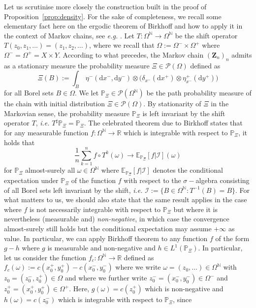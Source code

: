\documentclass[leqno, 11pt, a4paper]{amsart}
\theoremstyle{definition}
\newcommand{\cZ}{\mathbf{Z}}
\newcommand{\R}{\mathbb{R}}
\newcommand{\E}{\mathbb{E}}
\newcommand{\N}{\mathbb{N}}
\newcommand{\Pro}{\mathbb{P}}
\newcommand{\cP}{\mathcal{P}}
\newcommand{\dd}{\mathrm{d}}
\begin{document}
	Let us scrutinise more closely the construction built in the proof of Proposition~\ref{prop:density}. For the sake of  completeness, we recall some elementary fact here on the ergodic theorem of Birkhoff and how to apply it in the context of Markov chains, see \textit{e.g.} \cite{kallenbergFoundationsModernProbability2021a}. Let $T : \Omega^\N \to \Omega^\N$ be the shift operator $T(z_0, z_1, \dots) = (z_1, z_2, \dots)$, where we recall that $\Omega := \Omega^- \times \Omega^+$ where $\Omega^- = \Omega^+ = X \times Y$. According to what precedes, the Markov chain $(\cZ_n)_{n}$ admits as a stationary measure the probability measure $\Xi \in \cP(\Omega)$ defined as
	$$
	\Xi(B) := \int_{B}  \, \eta^-(\dd x^-,\dd y^-) \otimes \big(\delta_{x^-}(\dd x^+) \otimes \eta^+_{x^-}(\dd y^+)\big)
	$$
	for all Borel sets $B \in \Omega$. We let $\Pro_\Xi \in \cP(\Omega^\N)$ be the path probability measure of the chain with initial distribution $\Xi \in \cP(\Omega)$. By stationarity of $\Xi$ in the Markovian sense, the probability measure $\Pro_\Xi$ is left invariant by the shift operator  $T$, \textit{i.e.} $T^\sharp \Pro_\Xi = \Pro_\Xi$. The celebrated theorem due to Birkhoff states that for any measurable function $f : \Omega^\N \to \R$ which is integrable with respect to $\Pro_\Xi$, it holds that 
	$$
	\frac1n \sum_{k = 1}^n f \circ T^k(\omega) \to \E_{\Pro_\Xi}[f | \mathcal{I}](\omega)
	$$
	for $\Pro_\Xi$ almost-surely all $\omega \in \Omega^\N$ where $\E_{\Pro_\Xi}[f | \mathcal{I}]$ denotes the conditional expectation under $\Pro_\Xi$ of the function $f$ with respect to the $\sigma-$algebra consisting of all Borel sets left invariant by the shift, \textit{i.e.} $\mathcal{I} := \{ B \in \Omega^\N : T^{-1}(B) = B\}$. For what matters to us, we should also state that the same result applies in the case where $f$ is not necessarily integrable with respect to $\Pro_\Xi$ but where it is nevertheless (measurable and) \textit{non-negative}, in which case the convergence almost-surely still holds but the conditional expectation may assume $+\infty$ as value.  In particular, we can apply Birkhoff theorem to any function $f$ of the form $g - h$ where $g$ is measurable and non-negative and $h \in L^1(\Pro_\Xi)$. In particular, let us consider the function $f_c : \Omega^\N \to \R$ defined as $f_c(\omega) := c(x_0^+, y_0^+) - c(x_0^-, y_0^-)$ where we write $\omega = (z_0, \dots) \in \Omega^\N$ with $z_0 = (z_0^-, z_0^+) \in \Omega$ and where we further write $z_0^- = (x_0^-, y_0^-) \in \Omega^-$ and $z_0^+ = (x_0^+, y_0^+) \in \Omega^+$. Here, $g(\omega) = c(z_0^+)$ which is non-negative and $h(\omega) = c(z_0^-)$ which is integrable with respect to $\Pro_\Xi$, since
\end{document}
